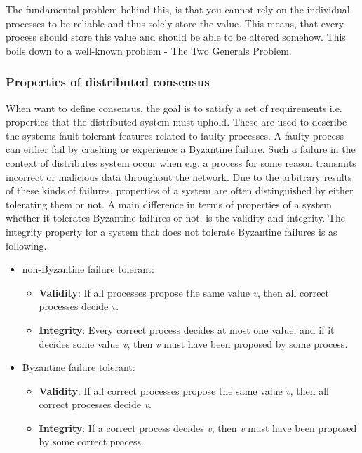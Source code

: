 The fundamental problem behind this, is that you cannot rely on the individual processes to be reliable and thus solely store the value. This means, that every process should store this value and should be able to be altered somehow. This boils down to a well-known problem - The Two Generals Problem.


\subsubsection{Properties of distributed consensus}
When want to define consensus, the goal is to satisfy a set of requirements i.e. properties that the distributed system must uphold. These are used to describe the systems fault tolerant features related to faulty processes. A faulty process can either fail by crashing or experience a Byzantine failure. Such a failure in the context of distributes system occur when e.g. a process for some reason transmits incorrect or malicious data throughout the network. Due to the arbitrary results of these kinds of failures, properties of a system are often distinguished by either tolerating them or not. A main difference in terms of properties of a system whether it tolerates Byzantine failures or not, is the validity and integrity. The integrity property for a system that does not tolerate Byzantine failures is as following\cite{DistributedSystems}.

\begin{itemize}
\item non-Byzantine failure tolerant:
	\begin{itemize}
	\item \textbf{Validity}: If all processes propose the same value \textit{v}, then all correct processes decide \textit{v}.
	\item \textbf{Integrity}: Every correct process decides at most one value, and if it decides some value \textit{v}, then \textit{v} must have been proposed by some process.
	\end{itemize}
\item Byzantine failure tolerant:
	\begin{itemize}
	\item \textbf{Validity}: If all correct processes propose the same value \textit{v}, then all correct processes decide \textit{v}.
	\item \textbf{Integrity}: If a correct process decides \textit{v}, then \textit{v} must have been proposed by some correct process.
	\end{itemize}
\end{itemize}

